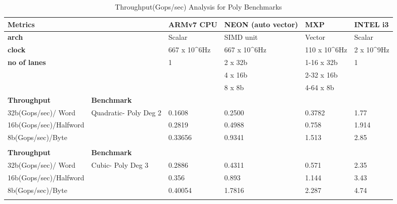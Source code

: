 \begin{table}[htbp]
	\centering
	\begin{adjustbox}{width=1\textwidth}
		\small
		\begin{tabular}{llllll}
			\toprule
			\textbf{Metrics} &   & \textbf{ARMv7 CPU} & \textbf{NEON (auto vector)} & \textbf{MXP} & \textbf{INTEL i3} \\
			\midrule
			\textbf{arch} &   & Scalar & SIMD unit & Vector & Scalar \\
			\textbf{clock} &   & 667 x 10^{6}Hz & 667 x 10^{6}Hz & 110 x 10^{6}Hz & 2 x 10^{9}Hz \\
			\textbf{no of lanes} &   & 1 & 2 x 32b & 1-16 x 32b & 1 \\
			&   &   & 4 x 16b & 2-32 x 16b &  \\
			&   &   & 8 x 8b & 4-64 x 8b &  \\
			\midrule
			 \textbf{Throughput} & \textbf{Benchmark} &   &   &   &  \\
			\midrule
			 32b(Gops/sec)/ Word   & Quadratic- Poly Deg 2  & 0.1608  & 0.2500 & 0.3782 & 1.77 \\
			 16b(Gops/sec)/Halfword &   & 0.2819 & 0.4988 & 0.758 & 1.914\\
			 8b(Gops/sec)/Byte &   & 0.33656 & 0.9341 & 1.513 & 2.85 \\
			   &   &   &   &   &  \\
			\midrule
			 \textbf{Throughput} & \textbf{Benchmark} &   &   &   &  \\
			\midrule
			 32b(Gops/sec)/ Word   & Cubic- Poly Deg 3    & 0.2886 & 0.4311 & 0.571 & 2.35 \\
			 16b(Gops/sec)/Halfword &   & 0.356 & 0.893 & 1.144 & 3.43 \\
			 8b(Gops/sec)/Byte &   & 0.40054 & 1.7816 & 2.287 & 4.74 \\
			   &   &   &   &   &  \\
			\bottomrule
		\end{tabular}%
	\end{adjustbox}%
	\caption{Throughput(Gops/sec) Analysis for Poly Benchmarks}
	\label{poly:c}%
\end{table}%
